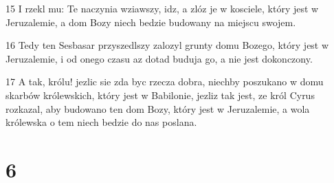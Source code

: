 \par 15 I rzekl mu: Te naczynia wziawszy, idz, a zlóz je w kosciele, który jest w Jeruzalemie, a dom Bozy niech bedzie budowany na miejscu swojem.
\par 16 Tedy ten Sesbasar przyszedlszy zalozyl grunty domu Bozego, który jest w Jeruzalemie, i od onego czasu az dotad buduja go, a nie jest dokonczony.
\par 17 A tak, królu! jezlic sie zda byc rzecza dobra, niechby poszukano w domu skarbów królewskich, który jest w Babilonie, jezliz tak jest, ze król Cyrus rozkazal, aby budowano ten dom Bozy, który jest w Jeruzalemie, a wola królewska o tem niech bedzie do nas poslana.

\chapter{6}

